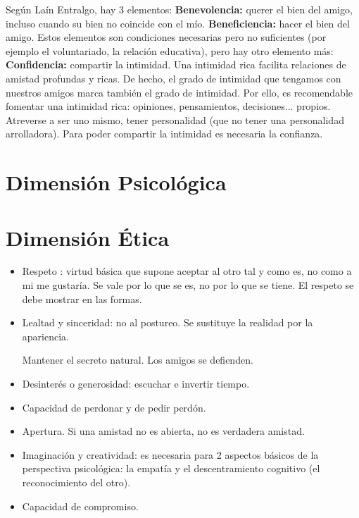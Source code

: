 \documentclass[palatino]{apuntesURJC}
\begin{document}
Según Laín Entralgo, hay 3 elementos:
%
\textbf{Benevolencia:} querer el bien del amigo, incluso cuando su bien no coincide con el mío.
%
\textbf{Beneficiencia:} hacer el bien del amigo.
%
Estos elementos son condiciones necesarias pero no suficientes (por ejemplo el voluntariado, la relación educativa), pero hay otro elemento más:
%
\textbf{Confidencia:} compartir la intimidad. 
%
Una intimidad rica facilita relaciones de amistad profundas y ricas.
%
De hecho, el grado de intimidad que tengamos con nuestros amigos marca también el grado de intimidad. 
%
Por ello, es recomendable fomentar una intimidad rica: opiniones, pensamientos, decisiones... propios.
%
Atreverse a ser uno mismo, tener personalidad (que no tener una personalidad arrolladora).
%
Para poder compartir la intimidad es necesaria la confianza.


\section{Dimensión Psicológica}

\section{Dimensión Ética}

\begin{itemize}
	\item Respeto : virtud básica que supone aceptar al otro tal y como es, no como a mi me gustaría.
	Se vale por lo que se es, no por lo que se tiene.
	\subitem El respeto se debe mostrar en las formas.


	\item Lealtad y sinceridad: no al postureo. Se sustituye la realidad por la apariencia.
	
	\subitem Mantener el secreto natural.
	\subitem Los amigos se defienden.
	
	\item Desinterés o generosidad: escuchar e invertir tiempo.

	\item Capacidad de perdonar y de pedir perdón.

	\item Apertura.
	\subitem Si una amistad no es abierta, no es verdadera amistad.

	\item Imaginación y creatividad: es necesaria para 2 aspectos básicos de la perspectiva psicológica: 
	la empatía y el descentramiento cognitivo (el reconocimiento del otro).

	\item Capacidad de compromiso.

\end{itemize}
\end{document}
